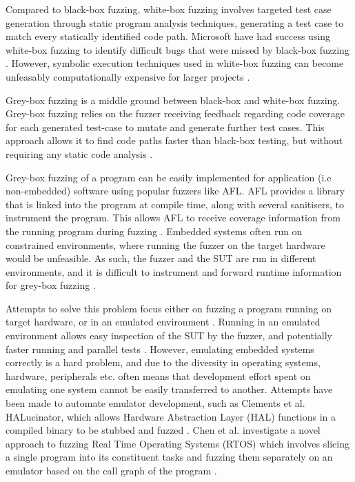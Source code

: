 \documentclass[../report.tex]{subfiles}
\begin{document}
Compared to black-box fuzzing, white-box fuzzing involves targeted test case
generation through static program analysis techniques, generating a test case
to match every statically identified code path. Microsoft have had success
using white-box fuzzing to identify difficult bugs that were missed by
black-box fuzzing \citep{Godefroid_2012}. However, symbolic execution
techniques used in white-box fuzzing can become unfeasably computationally
expensive for larger projects \citep{Krishnamoorthy_2010}.

Grey-box fuzzing is a middle ground between black-box and white-box fuzzing.
Grey-box fuzzing relies on the fuzzer receiving feedback regarding code
coverage for each generated test-case to mutate and generate further test
cases. This approach allows it to find code paths faster than black-box
testing, but without requiring any static code analysis \citep{Yun_2022}.

Grey-box fuzzing of a program can be easily implemented for application (i.e
non-embedded) software using popular fuzzers like AFL. AFL provides a library
that is linked into the program at compile time, along with several sanitisers,
to instrument the program. This allows AFL to receive coverage information from
the running program during fuzzing \citep{AFL_2019}. Embedded systems often run on
constrained environments, where running the fuzzer on the target hardware would
be unfeasible. As such, the fuzzer and the SUT are run in different
environments, and it is difficult to instrument and forward runtime information
for grey-box fuzzing \citep{Muench_2018}.

Attempts to solve this problem focus either on fuzzing a program running on
target hardware, or in an emulated environment \citep{Eisele_et_al_2022}.
Running in an emulated environment allows easy inspection of the SUT by the
fuzzer, and potentially faster running and parallel tests
\citep{Eisele_et_al_2022}. However, emulating embedded systems correctly is a
hard problem, and due to the diversity in operating systems, hardware,
peripherals etc. often means that development effort spent on emulating one
system cannot be easily transferred to another. Attempts have been made to
automate emulator development, such as Clements et al. HALucinator, which
allows Hardware Abstraction Layer (HAL) functions in a compiled binary to be
stubbed and fuzzed \citep{Clements_2021}.
Chen et al. investigate a novel approach to fuzzing Real Time Operating Systems
(RTOS) which involves slicing a single program into its constituent tasks and
fuzzing them separately on an emulator based on the call graph of the program
\citep{Chen_2022}.
\end{document}
